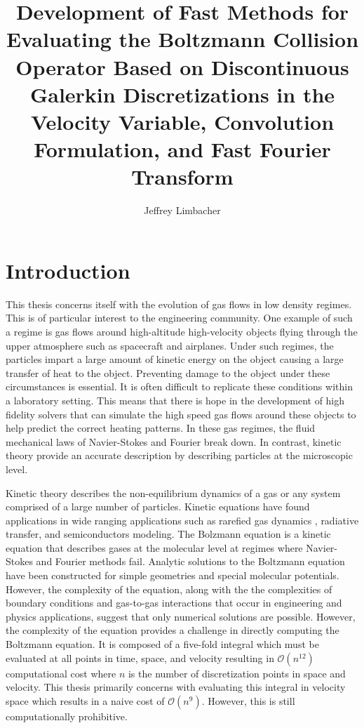 \documentclass[12pt]{CSUNthesis}
\author{Jeffrey Limbacher}
\title{Development of Fast Methods for Evaluating the Boltzmann Collision Operator Based on Discontinuous Galerkin Discretizations in the Velocity Variable, Convolution Formulation, and Fast Fourier Transform}
\begin{document}
\doublespacing


\chapter{Introduction}
\label{Chap1}
This thesis concerns itself with the evolution of gas flows in low density regimes. This is of particular interest to the engineering community. One example of such a regime is gas flows around high-altitude high-velocity objects flying through the upper atmosphere such as spacecraft and airplanes. Under such regimes, the particles impart a large amount of kinetic energy on the object causing a large transfer of heat to the object. Preventing damage to the object under these circumstances is essential. It is often difficult to replicate these conditions within a laboratory setting. This means that there is hope in the development of high fidelity solvers that can simulate the high speed gas flows around these objects to help predict the correct heating patterns. In these gas regimes, the fluid mechanical laws of Navier-Stokes and Fourier break down. In contrast, kinetic theory provide an accurate description by describing particles at the microscopic level.

Kinetic theory describes the non-equilibrium dynamics of a gas or any system comprised of a large number of particles. Kinetic equations have found applications in wide ranging applications such as rarefied gas dynamics \cite{Kremer2010} \cite{Kogan1969}, radiative transfer, and semiconductors modeling. 
The Bolzmann equation is a kinetic equation that describes gases at the molecular level at regimes where Navier-Stokes and Fourier methods fail. Analytic solutions to the Boltzmann equation have been constructed for simple geometries and special molecular potentials. However, the complexity of the equation, along with the the complexities of boundary conditions and gas-to-gas interactions that occur in engineering and physics applications, suggest that only numerical solutions are possible. However, the complexity of the equation provides a challenge in directly computing the Boltzmann equation. It is composed of a five-fold integral which must be evaluated at all points in time, space, and velocity resulting in $\mathcal{O}(n^{12})$ computational cost where $n$ is the number of discretization points in space and velocity. This thesis primarily concerns with evaluating this integral in velocity space which results in a naive cost of $\mathcal{O}(n^9)$. However, this is still computationally prohibitive.
\end{document}
